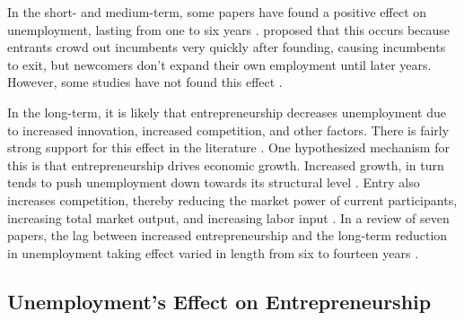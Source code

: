 \documentclass[]{ecca}
\begin{document}
In the short- and medium-term, some papers have found a positive effect on unemployment, lasting from one to six years \citep{fritsch04, dejardin11, baptista07}. \citeauthor{fritsch04} proposed that this occurs because entrants crowd out incumbents very quickly after founding, causing incumbents to exit, but newcomers don't expand their own employment until later years. However, some studies have not found this effect \citep{audretsch01}.

In the long-term, it is likely that entrepreneurship decreases unemployment due to increased innovation, increased competition, and other factors. There is fairly strong support for this effect in the literature \citep{plehn12, matejovsky14, fritsch04, dejardin11, audretsch98, koellinger09, thurik08}. One hypothesized mechanism for this is that entrepreneurship drives economic growth. Increased growth, in turn tends to push unemployment down towards its structural level \citep{matejovsky14}. Entry also increases competition, thereby reducing the market power of current participants, increasing total market output, and increasing labor input \citep{audretsch01}. In a review of seven papers, the lag between increased entrepreneurship and the long-term reduction in unemployment taking effect varied in length from six to fourteen years \citep{plehn12}. 


\subsection{Unemployment's Effect on Entrepreneurship}
\end{document}

